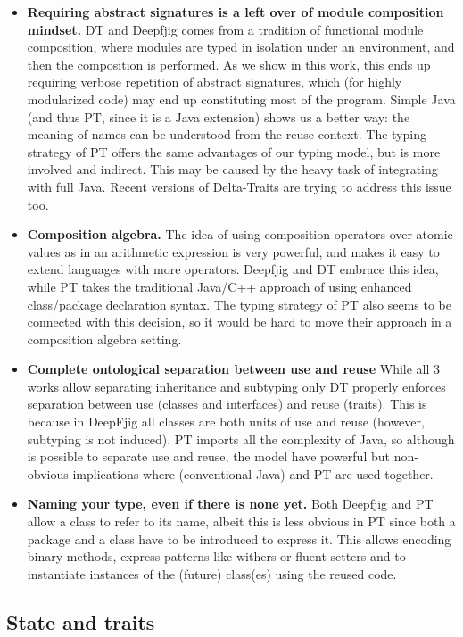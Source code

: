 \begin{itemize}
\item 
{\bf Requiring abstract signatures is a left over of module composition mindset.}
DT and Deepfjig comes from a tradition of functional module composition, where 
modules are typed in isolation under an environment, and then the composition is performed.
As we show in this work, this ends up requiring verbose repetition of abstract signatures,
which (for highly modularized code) may end up constituting most of the program.
Simple Java (and thus PT, since it is a Java extension) shows us a better way:
the meaning of names can be understood from the reuse context.
The typing strategy of PT offers the same advantages of our typing model, 
but is more involved and indirect. This may be caused by the
heavy task of integrating with full Java.
Recent versions of Delta-Traits are trying to address this issue too.
\item {\bf Composition algebra.}
The idea of using composition operators over atomic values as in an arithmetic expression is very powerful,
and makes it easy to extend languages with more operators. Deepfjig and DT embrace this idea, while PT takes the traditional Java/C++ approach of using enhanced class/package declaration syntax.
The typing strategy of PT also seems to be connected with this
decision, so it would be hard to move their approach in a composition
algebra setting.
\item {\bf Complete ontological separation between use and reuse}
While all 3 works allow separating inheritance and subtyping only DT properly enforces 
separation between use (classes and interfaces) and reuse (traits).
This is because in DeepFjig all classes are both units of use and reuse (however, subtyping is not induced).
PT imports all the complexity of Java, so although is possible to separate use and reuse, the model have powerful but non-obvious implications where (conventional Java) \Q@extends@ and PT are used together.
\item {\bf Naming your type, even if there is none yet.}
Both Deepfjig and PT allow a class to refer to its name, albeit this is
less obvious in PT since both a package and a class have to be introduced to express it.
This allows encoding binary methods, express patterns like withers or fluent setters and to instantiate instances of the (future) class(es)  using the reused code.

\end{itemize}

\subsection{State and traits}


